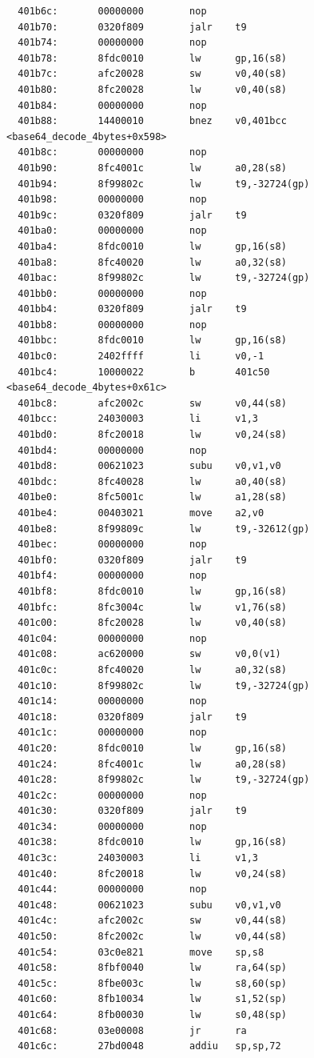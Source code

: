 \documentclass[11pt]{article}
\begin{document}
\begin{verbatim}
  401b6c:       00000000        nop
  401b70:       0320f809        jalr    t9
  401b74:       00000000        nop
  401b78:       8fdc0010        lw      gp,16(s8)
  401b7c:       afc20028        sw      v0,40(s8)
  401b80:       8fc20028        lw      v0,40(s8)
  401b84:       00000000        nop
  401b88:       14400010        bnez    v0,401bcc <base64_decode_4bytes+0x598>
  401b8c:       00000000        nop
  401b90:       8fc4001c        lw      a0,28(s8)
  401b94:       8f99802c        lw      t9,-32724(gp)
  401b98:       00000000        nop
  401b9c:       0320f809        jalr    t9
  401ba0:       00000000        nop
  401ba4:       8fdc0010        lw      gp,16(s8)
  401ba8:       8fc40020        lw      a0,32(s8)
  401bac:       8f99802c        lw      t9,-32724(gp)
  401bb0:       00000000        nop
  401bb4:       0320f809        jalr    t9
  401bb8:       00000000        nop
  401bbc:       8fdc0010        lw      gp,16(s8)
  401bc0:       2402ffff        li      v0,-1
  401bc4:       10000022        b       401c50 <base64_decode_4bytes+0x61c>
  401bc8:       afc2002c        sw      v0,44(s8)
  401bcc:       24030003        li      v1,3
  401bd0:       8fc20018        lw      v0,24(s8)
  401bd4:       00000000        nop
  401bd8:       00621023        subu    v0,v1,v0
  401bdc:       8fc40028        lw      a0,40(s8)
  401be0:       8fc5001c        lw      a1,28(s8)
  401be4:       00403021        move    a2,v0
  401be8:       8f99809c        lw      t9,-32612(gp)
  401bec:       00000000        nop
  401bf0:       0320f809        jalr    t9
  401bf4:       00000000        nop
  401bf8:       8fdc0010        lw      gp,16(s8)
  401bfc:       8fc3004c        lw      v1,76(s8)
  401c00:       8fc20028        lw      v0,40(s8)
  401c04:       00000000        nop
  401c08:       ac620000        sw      v0,0(v1)
  401c0c:       8fc40020        lw      a0,32(s8)
  401c10:       8f99802c        lw      t9,-32724(gp)
  401c14:       00000000        nop
  401c18:       0320f809        jalr    t9
  401c1c:       00000000        nop
  401c20:       8fdc0010        lw      gp,16(s8)
  401c24:       8fc4001c        lw      a0,28(s8)
  401c28:       8f99802c        lw      t9,-32724(gp)
  401c2c:       00000000        nop
  401c30:       0320f809        jalr    t9
  401c34:       00000000        nop
  401c38:       8fdc0010        lw      gp,16(s8)
  401c3c:       24030003        li      v1,3
  401c40:       8fc20018        lw      v0,24(s8)
  401c44:       00000000        nop
  401c48:       00621023        subu    v0,v1,v0
  401c4c:       afc2002c        sw      v0,44(s8)
  401c50:       8fc2002c        lw      v0,44(s8)
  401c54:       03c0e821        move    sp,s8
  401c58:       8fbf0040        lw      ra,64(sp)
  401c5c:       8fbe003c        lw      s8,60(sp)
  401c60:       8fb10034        lw      s1,52(sp)
  401c64:       8fb00030        lw      s0,48(sp)
  401c68:       03e00008        jr      ra
  401c6c:       27bd0048        addiu   sp,sp,72


\end{verbatim}
\end{document}

